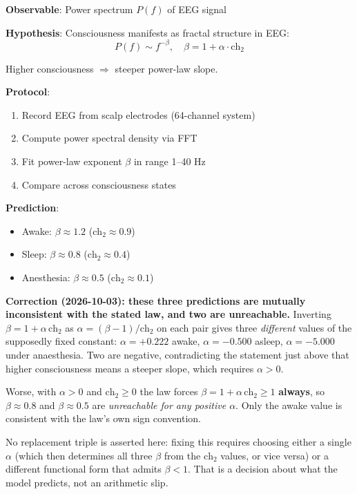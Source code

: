 \textbf{Observable}: Power spectrum $P(f)$ of EEG signal

\textbf{Hypothesis}: Consciousness manifests as fractal structure in EEG:
\begin{equation}
P(f) \sim f^{-\beta}, \quad \beta = 1 + \alpha \cdot \text{ch}_2
\end{equation}

Higher consciousness $\Rightarrow$ steeper power-law slope.

\textbf{Protocol}:
\begin{enumerate}
\item Record EEG from scalp electrodes (64-channel system)
\item Compute power spectral density via FFT
\item Fit power-law exponent $\beta$ in range 1--40 Hz
\item Compare across consciousness states
\end{enumerate}

\textbf{Prediction}:
\begin{itemize}
\item Awake: $\beta \approx 1.2$ ($\text{ch}_2 \approx 0.9$)
\item Sleep: $\beta \approx 0.8$ ($\text{ch}_2 \approx 0.4$)
\item Anesthesia: $\beta \approx 0.5$ ($\text{ch}_2 \approx 0.1$)
\end{itemize}

\medskip
\noindent\textbf{Correction (2026-10-03): these three predictions are mutually
inconsistent with the stated law, and two are unreachable.}
Inverting $\beta = 1 + \alpha\,\text{ch}_2$ as $\alpha = (\beta-1)/\text{ch}_2$
on each pair gives three \emph{different} values of the supposedly fixed
constant: $\alpha = +0.222$ awake, $\alpha = -0.500$ asleep,
$\alpha = -5.000$ under anaesthesia. Two are negative, contradicting the
statement just above that higher consciousness means a steeper slope, which
requires $\alpha > 0$.

Worse, with $\alpha > 0$ and $\text{ch}_2 \geq 0$ the law forces
$\beta = 1 + \alpha\,\text{ch}_2 \geq 1$ \textbf{always}, so
$\beta \approx 0.8$ and $\beta \approx 0.5$ are \emph{unreachable for any
positive $\alpha$}. Only the awake value is consistent with the law's own sign
convention.

No replacement triple is asserted here: fixing this requires choosing either a
single $\alpha$ (which then determines all three $\beta$ from the $\text{ch}_2$
values, or vice versa) or a different functional form that admits $\beta < 1$.
That is a decision about what the model predicts, not an arithmetic slip.

